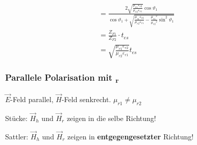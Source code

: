 \begin{equation*}
\begin{aligned}
		       & =\frac{2 \sqrt{\frac{\mu_{r 1} \varepsilon_{r 2}}{\mu_{r 2} \varepsilon_{r 1}}} \cos \vartheta_1}{\cos \vartheta_1+\sqrt{\frac{\mu_{r 1} \varepsilon_{r 2}}{\mu_{r 2} \varepsilon_{r 1}}-\frac{\mu_{r 1}{ }^2}{\mu_{r 2}{ }^2} \sin ^2 \vartheta_1}}                                                   \\
		       & = \frac{Z_{F1}}{Z_{F2}}\cdot t_{es}                                                                                                                                                                                                                                                                    \\
		       & =\sqrt{\frac{\mu_{r 1} \varepsilon_{r 2}}{\mu_{r 2} \varepsilon_{r 1}}} t_{e s}
	\end{aligned}
\end{equation*}

\columnbreak
\subsubsection{Parallele Polarisation mit \textmu\textsubscript{r}}
\begin{center}
	
\end{center}
$\vec{E}$-Feld parallel, $ \vec{H}$-Feld senkrecht. \qquad $ \mu_{r1} \neq \mu_{r2} $

\vspace{1em}
Stücke: $\vec{H}_h$ und $ \vec{H}_r$ zeigen in die selbe Richtung!

Sattler: $\vec{H}_h$ und $ \vec{H}_r$ zeigen in \textbf{entgegengesetzter} Richtung!


